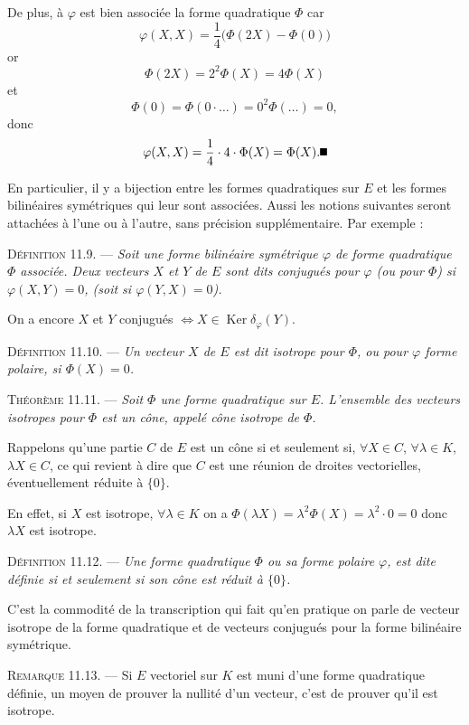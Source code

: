 De plus, à $\varphi$ est bien associée la forme quadratique $\Phi$ car
\[
\varphi(X,X)=\frac14\bigl(\Phi(2X)-\Phi(0)\bigr)
\]
or
\[
\Phi(2X)=2^2\Phi(X)=4\Phi(X)
\]
et
\[
\Phi(0)=\Phi(0\cdot\ldots)=0^2\Phi(\ldots)=0,
\]
donc
\[
\varphi(X,X)=\frac14\cdot4\cdot\Phi(X)=\Phi(X). \bookend
\]

En particulier, il y a bijection entre les formes quadratiques sur $E$ et les formes bilinéaires symétriques qui leur sont associées. Aussi les notions suivantes seront attachées à l'une ou à l'autre, sans précision supplémentaire. Par exemple :

\medskip\noindent\textsc{Définition 11.9.} --- \emph{Soit une forme bilinéaire symétrique $\varphi$ de forme quadratique $\Phi$ associée. Deux vecteurs $X$ et $Y$ de $E$ sont dits conjugués pour $\varphi$ (ou pour $\Phi$) si $\varphi(X,Y)=0$, (soit si $\varphi(Y,X)=0$).}

On a encore $X$ et $Y$ conjugués $\Longleftrightarrow X\in\operatorname{Ker}\delta_\varphi(Y)$.

\medskip\noindent\textsc{Définition 11.10.} --- \emph{Un vecteur $X$ de $E$ est dit isotrope pour $\Phi$, ou pour $\varphi$ forme polaire, si $\Phi(X)=0$.}

\medskip\noindent\textsc{Théorème 11.11.} --- \emph{Soit $\Phi$ une forme quadratique sur $E$. L'ensemble des vecteurs isotropes pour $\Phi$ est un cône, appelé cône isotrope de $\Phi$.}

Rappelons qu'une partie $C$ de $E$ est un cône si et seulement si, $\forall X\in C$, $\forall\lambda\in K$, $\lambda X\in C$, ce qui revient à dire que $C$ est une réunion de droites vectorielles, éventuellement réduite à $\{0\}$.

En effet, si $X$ est isotrope, $\forall\lambda\in K$ on a $\Phi(\lambda X)=\lambda^2\Phi(X)=\lambda^2\cdot0=0$ donc $\lambda X$ est isotrope. \bookend

\medskip\noindent\textsc{Définition 11.12.} --- \emph{Une forme quadratique $\Phi$ ou sa forme polaire $\varphi$, est dite définie si et seulement si son cône est réduit à $\{0\}$.}

C'est la commodité de la transcription qui fait qu'en pratique on parle de vecteur isotrope de la forme quadratique et de vecteurs conjugués pour la forme bilinéaire symétrique.

\medskip\noindent\textsc{Remarque 11.13.} --- Si $E$ vectoriel sur $K$ est muni d'une forme quadratique définie, un moyen de prouver la nullité d'un vecteur, c'est de prouver qu'il est isotrope.

